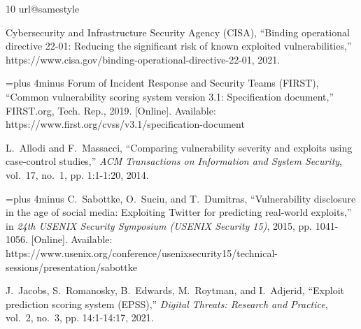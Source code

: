 \documentclass[journal]{IEEEtran}
\begin{document}
\begin{thebibliography}{10}
\providecommand{\url}[1]{#1}
\csname url@samestyle\endcsname
\providecommand{\newblock}{\relax}
\providecommand{\bibinfo}[2]{#2}
\providecommand{\BIBentrySTDinterwordspacing}{\spaceskip=0pt\relax}
\providecommand{\BIBentryALTinterwordstretchfactor}{4}
\providecommand{\BIBentryALTinterwordspacing}{\spaceskip=\fontdimen2\font plus
\BIBentryALTinterwordstretchfactor\fontdimen3\font minus
  \fontdimen4\font\relax}
\providecommand{\BIBforeignlanguage}[2]{{%
\expandafter\ifx\csname l@#1\endcsname\relax
\typeout{** WARNING: IEEEtran.bst: No hyphenation pattern has been}%
\typeout{** loaded for the language `#1'. Using the pattern for}%
\typeout{** the default language instead.}%
\else
\language=\csname l@#1\endcsname
\fi
#2}}
\providecommand{\BIBdecl}{\relax}
\BIBdecl

{Cybersecurity and Infrastructure Security Agency (CISA)}, ``Binding
  operational directive 22-01: Reducing the significant risk of known exploited
  vulnerabilities,''
  \url{https://www.cisa.gov/binding-operational-directive-22-01}, 2021.

\BIBentryALTinterwordspacing
{Forum of Incident Response and Security Teams (FIRST)}, ``Common vulnerability
  scoring system version 3.1: Specification document,'' FIRST.org, Tech. Rep.,
  2019. [Online]. Available:
  \url{https://www.first.org/cvss/v3.1/specification-document}
\BIBentrySTDinterwordspacing

L.~Allodi and F.~Massacci, ``Comparing vulnerability severity and exploits
  using case-control studies,'' \emph{ACM Transactions on Information and
  System Security}, vol.~17, no.~1, pp. 1:1-1:20, 2014.

\BIBentryALTinterwordspacing
C.~Sabottke, O.~Suciu, and T.~Dumitras, ``Vulnerability disclosure in the age
  of social media: Exploiting {Twitter} for predicting real-world exploits,''
  in \emph{24th {USENIX} Security Symposium ({USENIX} Security 15)}, 2015, pp.
  1041-1056. [Online]. Available:
  \url{https://www.usenix.org/conference/usenixsecurity15/technical-sessions/presentation/sabottke}
\BIBentrySTDinterwordspacing

J.~Jacobs, S.~Romanosky, B.~Edwards, M.~Roytman, and I.~Adjerid, ``Exploit
  prediction scoring system ({EPSS}),'' \emph{Digital Threats: Research and
  Practice}, vol.~2, no.~3, pp. 14:1-14:17, 2021.


\end{thebibliography}
\end{document}
